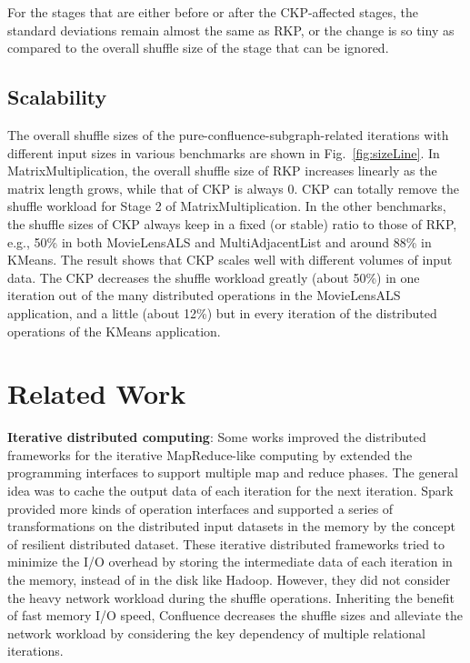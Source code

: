 \documentclass[10pt,journal,compsoc]{IEEEtran}
\begin{document}
For the stages that are either before or after the CKP-affected stages, the standard deviations remain almost the same as RKP, or the change is so tiny as compared to the overall shuffle size of the stage that can be ignored. 




\subsection{Scalability}
The overall shuffle sizes of the pure-confluence-subgraph-related iterations with different input sizes in various benchmarks are shown in Fig.~\ref{fig:sizeLine}. 
In MatrixMultiplication, 
the overall shuffle size of RKP increases linearly as the matrix length grows, while that of CKP is always 0. 
CKP can totally remove the shuffle workload for Stage 2 of MatrixMultiplication. 
In the other benchmarks, the shuffle sizes of CKP always keep in a fixed (or stable) ratio to those of RKP, e.g., 50\% in both MovieLensALS and MultiAdjacentList and around 88\% in KMeans. 
The result shows that CKP scales well with different volumes of input data. 
The CKP decreases the shuffle workload greatly (about 50\%) in one iteration out of the many distributed operations in the MovieLensALS application, and a little (about 12\%) but in every iteration of the distributed operations of the KMeans application. 



\section{Related Work}\label{section:relatedWork}
\textbf{Iterative distributed computing}: 
Some works \cite{gunarathne2013scalable, bu2010haloop, ekanayake2010twister} improved the distributed frameworks for the iterative MapReduce-like computing by extended the programming interfaces to support multiple map and reduce phases. 
The general idea was to cache the output data of each iteration for the next iteration. 
Spark \cite{zaharia2012resilient} provided more kinds of operation interfaces and supported a series of transformations on the distributed input datasets in the memory by the concept of resilient distributed dataset. 
These iterative distributed frameworks tried to minimize the I/O overhead by storing the intermediate data of each iteration in the memory, instead of in the disk like Hadoop. 
However, they did not consider the heavy network workload during the shuffle operations. 
Inheriting the benefit of fast memory I/O speed, Confluence decreases the shuffle sizes and alleviate the network workload by considering the key dependency of multiple relational iterations. 
\end{document}
